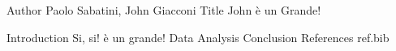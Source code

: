 Author Paolo Sabatini, John Giacconi 
Title	John è un Grande!
	
Introduction	Si, si! è un grande!
Data
Analysis
Conclusion
References ref.bib
